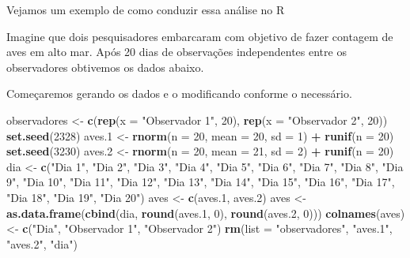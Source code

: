 \documentclass[14pt,titlepage, oneside, openany, a4paper]{book}
\newenvironment{Shaded}{\begin{snugshade}}{\end{snugshade}}
\newcommand{\DataTypeTok}[1]{\textcolor[rgb]{0.13,0.29,0.53}{#1}}
\newcommand{\DecValTok}[1]{\textcolor[rgb]{0.00,0.00,0.81}{#1}}
\newcommand{\FloatTok}[1]{\textcolor[rgb]{0.00,0.00,0.81}{#1}}
\newcommand{\KeywordTok}[1]{\textcolor[rgb]{0.13,0.29,0.53}{\textbf{#1}}}
\newcommand{\NormalTok}[1]{#1}
\newcommand{\OperatorTok}[1]{\textcolor[rgb]{0.81,0.36,0.00}{\textbf{#1}}}
\newcommand{\StringTok}[1]{\textcolor[rgb]{0.31,0.60,0.02}{#1}}
\begin{document}
Vejamos um exemplo de como conduzir essa análise no R

Imagine que dois pesquisadores embarcaram com objetivo de fazer contagem de aves em alto mar. Após 20 dias de observações independentes entre os observadores obtivemos os dados abaixo.

Começaremos gerando os dados e o modificando conforme o necessário.

\begin{Shaded}
\begin{Highlighting}[]
\NormalTok{observadores <-}\StringTok{ }\KeywordTok{c}\NormalTok{(}\KeywordTok{rep}\NormalTok{(}\DataTypeTok{x =} \StringTok{"Observador 1"}\NormalTok{, }\DecValTok{20}\NormalTok{), }\KeywordTok{rep}\NormalTok{(}\DataTypeTok{x =} \StringTok{"Observador 2"}\NormalTok{, }\DecValTok{20}\NormalTok{))}
\KeywordTok{set.seed}\NormalTok{(}\DecValTok{2328}\NormalTok{)}
\NormalTok{aves}\FloatTok{.1}\NormalTok{ <-}\StringTok{ }\KeywordTok{rnorm}\NormalTok{(}\DataTypeTok{n =} \DecValTok{20}\NormalTok{, }\DataTypeTok{mean =} \DecValTok{20}\NormalTok{, }\DataTypeTok{sd =} \DecValTok{1}\NormalTok{) }\OperatorTok{+}\StringTok{ }\KeywordTok{runif}\NormalTok{(}\DataTypeTok{n =} \DecValTok{20}\NormalTok{)}
\KeywordTok{set.seed}\NormalTok{(}\DecValTok{3230}\NormalTok{)}
\NormalTok{aves}\FloatTok{.2}\NormalTok{ <-}\StringTok{ }\KeywordTok{rnorm}\NormalTok{(}\DataTypeTok{n =} \DecValTok{20}\NormalTok{, }\DataTypeTok{mean =} \DecValTok{21}\NormalTok{, }\DataTypeTok{sd =} \DecValTok{2}\NormalTok{) }\OperatorTok{+}\StringTok{ }\KeywordTok{runif}\NormalTok{(}\DataTypeTok{n =} \DecValTok{20}\NormalTok{)}
\NormalTok{dia <-}\StringTok{ }\KeywordTok{c}\NormalTok{(}\StringTok{"Dia 1"}\NormalTok{, }\StringTok{"Dia 2"}\NormalTok{, }\StringTok{"Dia 3"}\NormalTok{, }\StringTok{"Dia 4"}\NormalTok{, }\StringTok{"Dia 5"}\NormalTok{, }\StringTok{"Dia 6"}\NormalTok{, }\StringTok{"Dia 7"}\NormalTok{, }\StringTok{"Dia 8"}\NormalTok{, }
         \StringTok{"Dia 9"}\NormalTok{, }\StringTok{"Dia 10"}\NormalTok{, }\StringTok{"Dia 11"}\NormalTok{, }\StringTok{"Dia 12"}\NormalTok{, }\StringTok{"Dia 13"}\NormalTok{, }\StringTok{"Dia 14"}\NormalTok{, }\StringTok{"Dia 15"}\NormalTok{, }\StringTok{"Dia 16"}\NormalTok{,}
         \StringTok{"Dia 17"}\NormalTok{, }\StringTok{"Dia 18"}\NormalTok{, }\StringTok{"Dia 19"}\NormalTok{, }\StringTok{"Dia 20"}\NormalTok{)}
\NormalTok{aves <-}\StringTok{ }\KeywordTok{c}\NormalTok{(aves}\FloatTok{.1}\NormalTok{, aves}\FloatTok{.2}\NormalTok{)}
\NormalTok{aves <-}\StringTok{ }\KeywordTok{as.data.frame}\NormalTok{(}\KeywordTok{cbind}\NormalTok{(dia, }\KeywordTok{round}\NormalTok{(aves}\FloatTok{.1}\NormalTok{, }\DecValTok{0}\NormalTok{), }\KeywordTok{round}\NormalTok{(aves}\FloatTok{.2}\NormalTok{, }\DecValTok{0}\NormalTok{)))}
\KeywordTok{colnames}\NormalTok{(aves) <-}\StringTok{ }\KeywordTok{c}\NormalTok{(}\StringTok{"Dia"}\NormalTok{, }\StringTok{"Observador 1"}\NormalTok{, }\StringTok{"Observador 2"}\NormalTok{)}
\KeywordTok{rm}\NormalTok{(}\DataTypeTok{list =} \StringTok{"observadores"}\NormalTok{, }\StringTok{"aves.1"}\NormalTok{, }\StringTok{"aves.2"}\NormalTok{, }\StringTok{"dia"}\NormalTok{)}
\end{Highlighting}
\end{Shaded}
\end{document}
